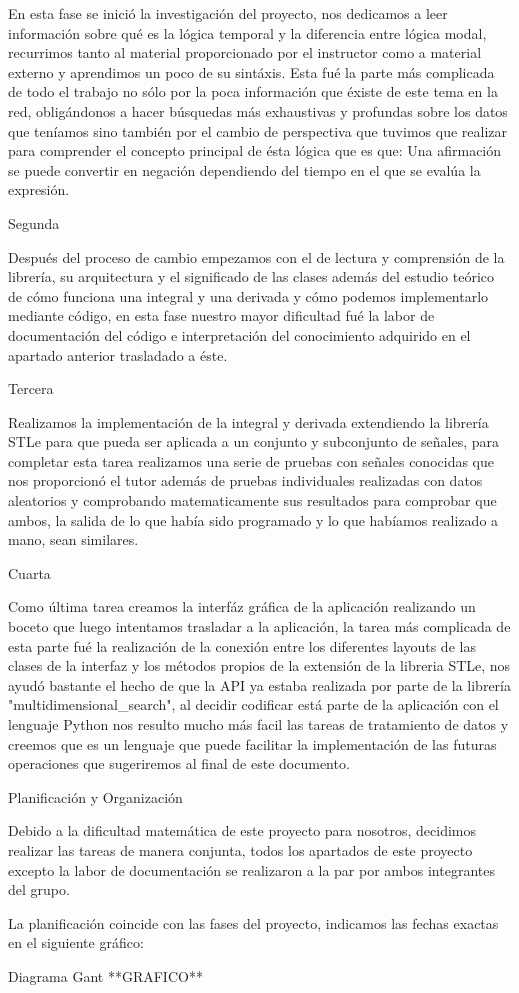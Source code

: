 	En esta fase se inició la investigación del proyecto, nos dedicamos a leer información sobre qué es la lógica temporal y la diferencia entre lógica modal, recurrimos tanto al material proporcionado por el instructor como a material externo y aprendimos un poco de su sintáxis. Esta fué la parte más complicada de todo el trabajo no sólo por la poca información que éxiste de este tema en la red, obligándonos a hacer búsquedas más exhaustivas y profundas sobre los datos que teníamos sino también por el cambio de perspectiva que tuvimos que realizar para comprender el concepto principal de ésta lógica que es que: Una afirmación se puede convertir en negación dependiendo del tiempo en el que se evalúa la expresión. 
	
Segunda

	Después del proceso de cambio empezamos con el de lectura y comprensión de la librería, su arquitectura y el significado de las clases además del estudio teórico de cómo funciona una integral y una derivada y cómo podemos implementarlo mediante código, en esta fase nuestro mayor dificultad fué la labor de documentación del código e interpretación del conocimiento adquirido en el apartado anterior trasladado a éste. 

Tercera
	
	Realizamos la implementación de la integral y derivada extendiendo la librería STLe para que pueda ser aplicada a un conjunto y subconjunto de señales, para completar esta tarea realizamos una serie de pruebas con señales conocidas que nos proporcionó el tutor además de pruebas individuales realizadas con datos aleatorios y comprobando matematicamente sus resultados para comprobar que ambos, la salida de lo que había sido programado y lo que habíamos realizado a mano, sean similares.

Cuarta 

	Como última tarea creamos la interfáz gráfica de la aplicación realizando un boceto que luego intentamos trasladar a la aplicación, la tarea más complicada de esta parte fué la realización de la conexión entre los diferentes layouts de las clases de la interfaz y los métodos propios de la extensión de la libreria STLe, nos ayudó bastante el hecho de que la API ya estaba realizada por parte de la librería "multidimensional\_search", al decidir codificar está parte de la aplicación con el lenguaje Python nos resulto mucho más facil las tareas de tratamiento de datos y creemos que es un lenguaje que puede facilitar la implementación de las futuras operaciones que sugeriremos al final de este documento. 


Planificación y Organización

Debido a la dificultad matemática de este proyecto para nosotros, decidimos realizar las tareas de manera conjunta, todos los apartados de este proyecto excepto la labor de documentación se realizaron a la par por ambos integrantes del grupo. 

La planificación coincide con las fases del proyecto, indicamos las fechas exactas en el siguiente gráfico: 

Diagrama Gant **GRAFICO**